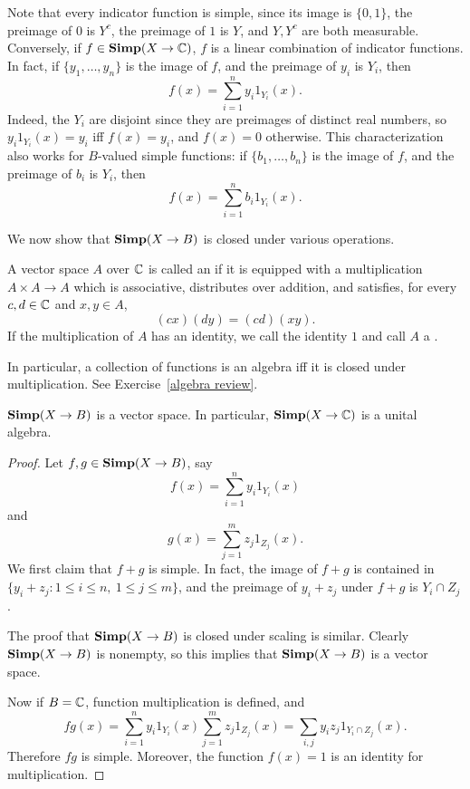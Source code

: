 \begin{subsec}
Note that every indicator function is simple, since its image is $\{0, 1\}$, the preimage of $0$ is $Y^c$, the preimage of $1$ is $Y$, and $Y,Y^c$ are both measurable.
Conversely, if $f \in \mathbf{Simp}(X \to \mathbb{C})$, $f$ is a linear combination of indicator functions. In fact, if $\{y_1, \dots, y_{n}\}$ is the image of $f$, and the preimage of $y_i$ is $Y_i$, then
\[f(x) = \sum_{i=1}^{n} y_i1_{Y_i}(x).\]
Indeed, the $Y_i$ are disjoint since they are preimages of distinct real numbers, so $y_i1_{Y_i}(x) = y_i$ iff $f(x) = y_i$, and $f(x) = 0$ otherwise.
This characterization also works for $B$-valued simple functions: if $\{b_1, \dots, b_{n}\}$ is the image of $f$, and the preimage of $b_i$ is $Y_i$, then
\[f(x) = \sum_{i=1}^{n} b_i1_{Y_i}(x).\]
\end{subsec}

\begin{subsec}
We now show that $\mathbf{Simp}(X \to B)$ is closed under various operations.
\end{subsec}

\begin{definition}
A vector space $A$ over $\mathbb{C}$ is called an  if it is equipped with a multiplication $A \times A \to A$ which is associative, distributes over addition, and satisfies, for every $c,d \in \mathbb{C}$ and $x,y \in A$,
\[(cx)(dy) = (cd)(xy).\]
If the multiplication of $A$ has an identity, we call the identity $1$ and call $A$ a .
\end{definition}

\begin{subsec}
In particular, a collection of functions is an algebra iff it is closed under multiplication.
See Exercise~\ref{algebra review}.
\end{subsec}

\begin{lemma}
\label{Simp is an algebra}
$\mathbf{Simp}(X \to B)$ is a vector space. In particular, $\mathbf{Simp}(X \to \mathbb{C})$ is a unital algebra.
\end{lemma}
\begin{proof}
Let $f, g \in \mathbf{Simp}(X \to B)$, say
\[f(x) = \sum_{i=1}^{n} y_i1_{Y_i}(x)\]
and
\[g(x) = \sum_{j=1}^{m} z_{j}1_{Z_{j}}(x).\]
We first claim that $f + g$ is simple. In fact, the image of $f + g$ is contained in $\{y_{i} + z_{j}: 1 \leq i \leq n, ~1 \leq j \leq m\}$, and the preimage of $y_{i} + z_{j}$ under $f + g$ is $Y_{i} \cap Z_{j}$.

The proof that $\mathbf{Simp}(X \to B)$ is closed under scaling is similar. Clearly $\mathbf{Simp}(X \to B)$ is nonempty, so this implies that $\mathbf{Simp}(X \to B)$ is a vector space.

Now if $B = \mathbb{C}$, function multiplication is defined, and
\[fg(x) = \sum_{i=1}^{n} y_i1_{Y_i}(x)\sum_{j=1}^{m} z_{j}1_{Z_{j}}(x) = \sum_{i,j} y_iz_{j} 1_{Y_{i} \cap Z_{j}}(x).\]
Therefore $fg$ is simple.
Moreover, the function $f(x) = 1$ is an identity for multiplication.
\end{proof}

